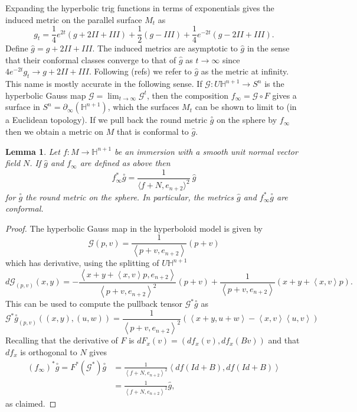 \documentclass{amsart}
\newcommand{\two}{I\!\!I}
\newcommand{\three}{I\!\!I\!\!I}
\newtheorem{lem}[thm]{Lemma}
\renewcommand{\H}{\mathbb{H}}
\begin{document}
Expanding the hyperbolic trig functions in terms of exponentials gives the induced metric on the parallel surface $M_t$ as 
\[
g_t = \frac{1}{4}e^{2t}(g + 2\two + \three) + \frac{1}{2}(g - \three) + \frac{1}{4}e^{-2t}(g - 2\two + \three).
\]
Define $\hat{g} = g + 2\two + \three$.
The induced metrics are asymptotic to $\hat{g}$ in the sense that their conformal classes converge to that of $\hat{g}$ as $t \to \infty$ since $4e^{-2t}g_t \to g + 2\two + \three$.
Following (refs) we refer to $\hat{g}$ as the metric at infinity.
This name is mostly accurate in the following sense. 
If $\mathcal{G}: U\H^{n+1} \to S^n$ is the hyperbolic Gauss map $\mathcal{G} = \lim_{t \to \infty} \mathcal{G}^t$, then the composition $f_\infty = \mathcal{G} \circ F$ gives a
surface in $S^n = \partial_\infty(\H^{n+1})$, which the surfaces $M_t$ can be shown to limit to (in a Euclidean topology). 
If we pull back the round metric $\overset{\circ}{g}$ on the sphere by $f_\infty$ then we obtain a metric on $M$ that is conformal to $\hat{g}$. 

\begin{lem}
\label{HypGaussMap}
Let $f: M \to \H^{n+1}$ be an immersion with a smooth unit normal vector field $N$. If $\hat{g}$ and $f_\infty$ are defined as above then 
\[
f^*_\infty \overset{\circ}{g} = \frac{1}{\langle f + N, e_{n+2}\rangle^2} \ \hat{g}
\]
for $\overset{\circ}{g}$ the round metric on the sphere.
In particular, the metrics $\hat{g}$ and $f_\infty^*\overset{\circ}{g}$ are conformal.
\end{lem}

\begin{proof}
The hyperbolic Gauss map in the hyperboloid model is given by 
\[
\mathcal{G}(p,v) = \frac{1}{\left< p + v, e_{n+2} \right>} (p + v)
\]
which has derivative, using the splitting of $U\H^{n+1}$
\[
d\mathcal{G}_{(p,v)}(x,y) = 
-\frac{\left< x + y + \left<x,v\right>p, e_{n+2} \right>}{\left< p + v, e_{n+2} \right>^2}(p+v) + \frac{1}{\left< p + v, e_{n+2} \right>}(x + y + \left<x,v\right>p).
\]
This can be used to compute the pullback tensor $\mathcal{G}^*\overset{\circ}{g}$ as
\[
\mathcal{G}^*\overset{\circ}{g}_{(p,v)}((x,y),(u,w))
= \frac{1}{\left< p+v, e_{n+2}\right>^2}\left( \left<x+y,u+w\right> - \left<x,v\right>\left<u,v\right>\right)
\]
Recalling that the derivative of $F$ is $dF_x(v) = (df_x(v),df_x(Bv))$ and that $df_x$ is orthogonal to $N$ gives 
\begin{align*}
(f_\infty)^*\overset{\circ}{g} = F^*(\mathcal{G}^*)\overset{\circ}{g}
&=\frac{1}{\left< f + N , e_{n+2}\right>^2} \left< df(Id + B),df(Id + B)\right> \\
&= \frac{1}{\left< f + N , e_{n+2}\right>^2} \hat{g},
\end{align*}
as claimed.
\end{proof}
\end{document}
